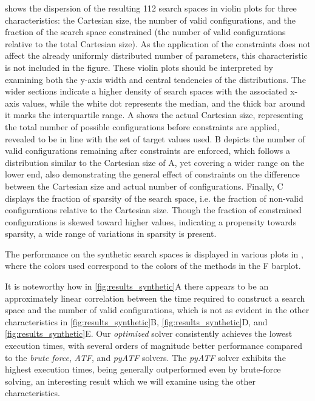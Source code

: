  shows the dispersion of the resulting 112 search spaces in violin plots for three characteristics: the Cartesian size, the number of valid configurations, and the fraction of the search space constrained (the number of valid configurations relative to the total Cartesian size). 
As the application of the constraints does not affect the already uniformly distributed number of parameters, this characteristic is not included in the figure. 
These violin plots should be interpreted by examining both the y-axis width and central tendencies of the distributions. The wider sections indicate a higher density of search spaces with the associated x-axis values, while the white dot represents the median, and the thick bar around it marks the interquartile range.
A shows the actual Cartesian size, representing the total number of possible configurations before constraints are applied, revealed to be in line with the set of target values used. 
B depicts the number of valid configurations remaining after constraints are enforced, which follows a distribution similar to the Cartesian size of A, yet covering a wider range on the lower end, also demonstrating the general effect of constraints on the difference between the Cartesian size and actual number of configurations. 
Finally, C displays the fraction of sparsity of the search space, i.e. the fraction of non-valid configurations relative to the Cartesian size. 
Though the fraction of constrained configurations is skewed toward higher values, indicating a propensity towards sparsity, a wide range of variations in sparsity is present. 


The performance on the synthetic search spaces is displayed in various plots in , where the colors used correspond to the colors of the methods in the F barplot. 

It is noteworthy how in \cref{fig:results_synthetic}A there appears to be an approximately linear correlation between the time required to construct a search space and the number of valid configurations, which is not as evident in the other characteristics in \cref{fig:results_synthetic}B, \cref{fig:results_synthetic}D, and \cref{fig:results_synthetic}E. 
Our \textit{optimized} solver consistently achieves the lowest execution times, with several orders of magnitude better performance compared to the \textit{brute force}, \textit{ATF}, and \textit{pyATF} solvers. The \textit{pyATF} solver exhibits the highest execution times, being generally outperformed even by brute-force solving, an interesting result which we will examine using the other characteristics. 

